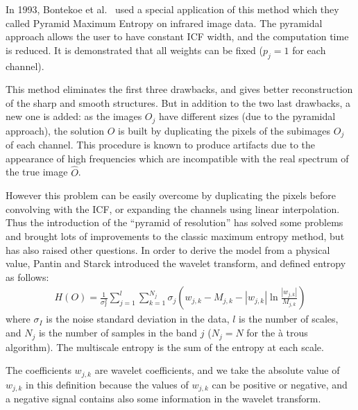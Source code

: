 In 1993, Bontekoe et al.\ \cite{entropy:bontekoe94} used a special application 
of this method which 
they called Pyramid Maximum Entropy on infrared image data.
The pyramidal approach allows the user to have constant ICF width, and the 
computation time is reduced. It is demonstrated \cite{entropy:bontekoe94} that
all weights can be fixed ($p_j = 1$ for each channel). 

This method eliminates the first three drawbacks, and
gives better reconstruction of the sharp 
and smooth structures. But in addition 
to the two last drawbacks, a new one is added:
as the images $O_j$ have different sizes (due to the pyramidal approach),
the solution $O$ is built by duplicating the pixels of 
the subimages $O_j$ of each channel. This procedure is known to produce 
artifacts due to the  appearance of high frequencies which are
incompatible with the 
real spectrum of the true image $\hat{O}$.

However this problem can 
be easily overcome by duplicating the pixels before convolving with the ICF, 
or expanding the channels using linear 
interpolation. Thus the introduction of the ``pyramid of resolution'' has 
solved some problems and brought lots of improvements to the classic maximum
entropy method, but has also raised other questions. In order to derive the
model from a physical value, Pantin and Starck \cite{starck:pan96} 
introduced the wavelet 
transform, and defined entropy as follows:
\begin{eqnarray}
H(O) =  \frac{1}{\sigma_I^2}\sum_{j=1}^l \sum_{k=1}^{N_j} \sigma_j( w_{j,k}- M_{j,k}- |w_{j,k}|\ln{\frac{|w_{j,k}|}{M_{j,k}}})
\label{eqn_entr}
\end{eqnarray}
where $\sigma_I$ is the noise standard deviation in the data, $l$ is the number of scales, and
$N_j$ is the number of samples in the band $j$
($N_j = N$ for the \`a trous algorithm). 
The multiscale entropy is the sum of the entropy at each scale.

The coefficients $w_{j,k}$ are wavelet coefficients, and we 
take the absolute value of $w_{j,k}$ in this definition because the  
values of $w_{j,k}$ can be positive or negative, and a negative signal 
contains also some information in
the wavelet transform. 

